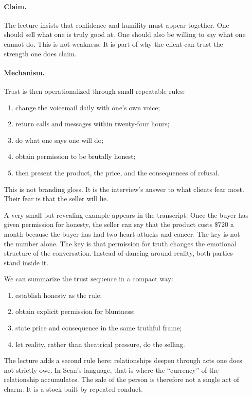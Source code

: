 \paragraph{Claim.}
The lecture insists that confidence and humility must appear together. One should sell what one is truly good at. One should also be willing to say what one cannot do. This is not weakness. It is part of why the client can trust the strength one does claim.

\paragraph{Mechanism.}
Trust is then operationalized through small repeatable rules:
\begin{enumerate}
\item change the voicemail daily with one's own voice;
\item return calls and messages within twenty-four hours;
\item do what one says one will do;
\item obtain permission to be brutally honest;
\item then present the product, the price, and the consequences of refusal.
\end{enumerate}
This is not branding gloss. It is the interview's answer to what clients fear most. Their fear is that the seller will lie.

A very small but revealing example appears in the transcript. Once the buyer has given permission for honesty, the seller can say that the product costs \$720 a month because the buyer has had two heart attacks and cancer. The key is not the number alone. The key is that permission for truth changes the emotional structure of the conversation. Instead of dancing around reality, both parties stand inside it.

We can summarize the trust sequence in a compact way:
\begin{enumerate}
\item establish honesty as the rule;
\item obtain explicit permission for bluntness;
\item state price and consequence in the same truthful frame;
\item let reality, rather than theatrical pressure, do the selling.
\end{enumerate}

The lecture adds a second rule here: relationships deepen through acts one does not strictly owe. In Sean's language, that is where the ``currency'' of the relationship accumulates. The sale of the person is therefore not a single act of charm. It is a stock built by repeated conduct.

